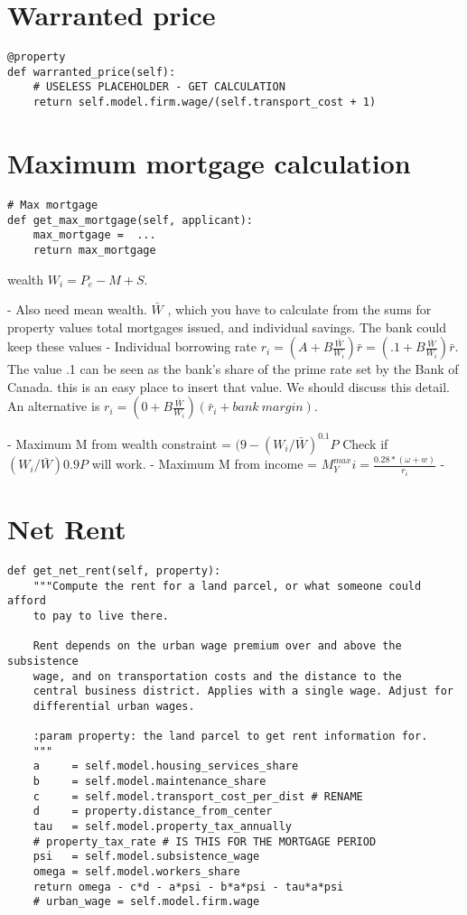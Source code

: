 \section{Warranted price}
\begin{lstlisting}
@property
def warranted_price(self):
    # USELESS PLACEHOLDER - GET CALCULATION
    return self.model.firm.wage/(self.transport_cost + 1) 
\end{lstlisting}

\section{Maximum mortgage calculation}

\begin{lstlisting}
# Max mortgage
def get_max_mortgage(self, applicant):
    max_mortgage =  ...
    return max_mortgage
\end{lstlisting}


wealth $W_i = P_e-M+S$.  

- Also need mean wealth. $\bar W$ , which you have to calculate from the sums for property values total mortgages issued, and individual savings. The bank could keep these values
- Individual borrowing rate 
$r_i = (A + B \frac{\bar{W}}{W_i})\bar r=(.1 + B \frac{\bar{W}}{W_i})\bar r$.
The value .1 can be seen as the bank's share of the prime rate set by the Bank of Canada. this is an easy place to insert that value. We should discuss this detail. An alternative is
$r_i = (0 + B \frac{\bar{W}}{W_i})(\bar r_i+ bank\ margin)$.

- Maximum M  from wealth constraint = $(9-(W_i/\bar W)^{0.1}P$
  Check if $(W_i/\bar W)0.9P$ will work. 
- Maximum M  from income = $M^{max}_Yi = \frac{0.28*(\omega+w)}{r_i}$ 
- 

\section{Net Rent}

\begin{lstlisting}
def get_net_rent(self, property):
    """Compute the rent for a land parcel, or what someone could afford
    to pay to live there. 

    Rent depends on the urban wage premium over and above the subsistence
    wage, and on transportation costs and the distance to the
    central business district. Applies with a single wage. Adjust for
    differential urban wages.

    :param property: the land parcel to get rent information for.
    """
    a     = self.model.housing_services_share
    b     = self.model.maintenance_share
    c     = self.model.transport_cost_per_dist # RENAME
    d     = property.distance_from_center 
    tau   = self.model.property_tax_annually 
    # property_tax_rate # IS THIS FOR THE MORTGAGE PERIOD
    psi   = self.model.subsistence_wage
    omega = self.model.workers_share
    return omega - c*d - a*psi - b*a*psi - tau*a*psi
    # urban_wage = self.model.firm.wage
\end{lstlisting}

